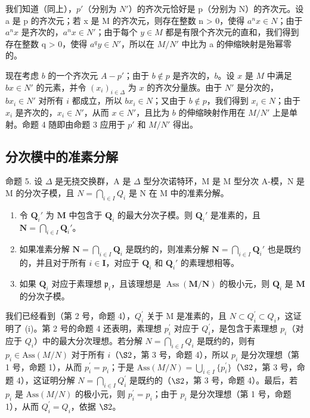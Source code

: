   我们知道（同上），\(p'\)（分别为 \(N'\)）的齐次元恰好是 p（分别为 N）的齐次元。设 a 是 p 的齐次元；若 x 是 M 的齐次元，则存在整数 n \textgreater{} 0，使得 \(a^{n}x \in N\)；由于 \(a^{n}x\) 是齐次的，\(a^{n}x \in N'\)；由于每个 \(y \in M\) 都是有限个齐次元的直和，我们得到存在整数 q \textgreater{} 0，使得 \(a^{q}y \in N'\)，所以在 \(M/N'\) 中比为 a 的伸缩映射是殆幂零的。

  现在考虑 \(b\) 的一个齐次元 \(A - p'\)；由于 \(b \notin p\) 是齐次的，\(b\)。设 \(x\) 是 \(M\) 中满足 \(bx \in N'\) 的元素，并令 \((x_i)_{i \in \Delta}\) 为 \(x\) 的齐次分量族。由于 \(N'\) 是分次的，\(bx_i \in N'\) 对所有 \(i\) 都成立，所以 \(bx_i \in N\)；又由于 \(b \notin p\)，我们得到 \(x_i \in N\)；由于 \(x_i\) 是齐次的，\(x_i \in N'\)，从而 \(x \in N'\)，且比为 \(b\) 的伸缩映射作用在 \(M/N'\) 上是单射。命题 4 随即由命题 3 应用于 \(p'\) 和 \(M/N'\) 得出。

\subsection{分次模中的准素分解}

命题 5. 设 \(\Delta\) 是无挠交换群，A 是 \(\Delta\) 型分次诺特环，M 是 M 型分次 A-模，N 是 M 的分次子模，且 \(N = \bigcap_{i \in I} Q_i\) 是 N 在 M 中的准素分解。

\begin{enumerate}
\def\labelenumi{(\roman{enumi})}
\item
  令 \(\mathbf{Q}_i'\) 为 \(\mathbf{M}\) 中包含于 \(\mathbf{Q}_i\) 的最大分次子模。则 \(\mathbf{Q}_i'\) 是准素的，且 \(\mathbf{N} = \bigcap_{i \in I} \mathbf{Q}_i'\)。
\item
  如果准素分解 \(\mathbf{N} = \bigcap_{i\in I}\mathbf{Q}_i\) 是既约的，则准素分解 \(\mathbf{N} = \bigcap_{i\in I}\mathbf{Q}_i'\) 也是既约的，并且对于所有 \(i\in \mathbf{I}\)，对应于 \(\mathbf{Q}_i\) 和 \(\mathbf{Q}_i'\) 的素理想相等。
\item
  如果 \(\mathbf{Q}_i\) 对应于素理想 \(\mathfrak{p}_i\)，且该理想是 \(\operatorname{Ass}(\mathbf{M} / \mathbf{N})\) 的极小元，则 \(\mathbf{Q}_i\) 是 \(\mathbf{M}\) 的分次子模。
\end{enumerate}

  我们已经看到（第 2 号，命题 4），\(Q_{i}^{\prime}\) 关于 M 是准素的，且 \(N \subset Q_{i}^{\prime} \subset Q_{i}\)，这证明了 (i)。第 2 号的命题 4 还表明，素理想 \(p_{i}^{\prime}\) 对应于 \(Q_{i}^{\prime}\)，是包含于素理想 \(p_{i}\)（对应于 \(Q_{i}\)）中的最大分次理想。若分解 \(N = \bigcap_{i \in I} Q_{i}\) 是既约的，则有 \(p_{i} \in \text{Ass}(M/N)\) 对于所有 \(i\)（\(\S 2\)，第 3 号，命题 4），所以 \(p_{i}\) 是分次理想（第 1 号，命题 1），从而 \(p_{i}^{\prime} = p_{i}\)；于是 \(\text{Ass}(M/N) = \bigcup_{i \in I} \{p_{i}^{\prime}\}\)（\(\S 2\)，第 3 号，命题 4），这证明分解 \(N = \bigcap_{i \in I} Q_{i}^{\prime}\) 是既约的（\(\S 2\)，第 3 号，命题 4）。最后，若 \(p_{i}\) 是 \(\text{Ass}(M/N)\) 的极小元，则 \(p_{i}^{\prime} = p_{i}\)；由于 \(p_{i}\) 是分次理想（第 1 号，命题 1），从而 \(Q_{i}^{\prime} = Q_{i}\)，依据 \(\S 2\)。

